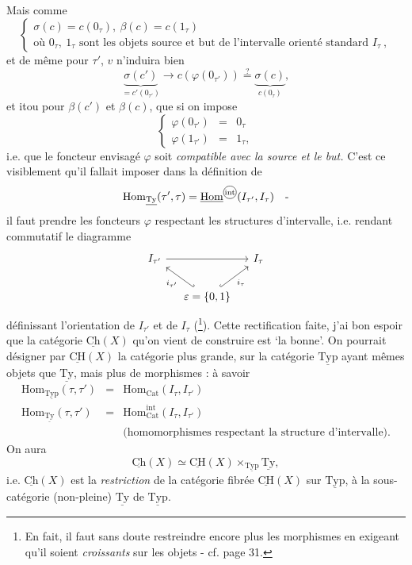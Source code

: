 \documentclass[11pt]{article}
\newcommand{\printedpage}[1]{\marginpar{\footnotesize p.~#1}}
\newcommand{\msp}[1]{\marginpar{\footnotesize [#1]}}
\newcommand{\ul}[1]{\underline{\mathrm{#1}}}
\newcommand{\circled}[1]{\tikz[baseline=(c.base)]\node[draw,circle,inner sep=0.4pt](c){\scriptsize #1};}
\begin{document}
\printedpage{19}

\msp{page 29}
Mais comme
\[
\left\{
\begin{array}{l}
\sigma(c)=c(0_\tau),\ \beta(c)=c(1_\tau)\\[1ex]
\text{où } 0_\tau,\ 1_\tau \text{ sont les objets source et but de l'intervalle orienté standard } I_\tau\ ,
\end{array}
\right.
\]
et de même pour $\tau'$, $v$ n'induira bien
\[
\underbrace{\sigma(c')}_{=c'(0_{\tau'})} \longrightarrow c(\varphi(0_{\tau'})) \overset{?}{=} \underbrace{\sigma(c)}_{c(0_\tau)},
\]
et itou pour $\beta(c')$ et $\beta(c)$, que si on impose
\[
\boxed{
\left\{
\begin{array}{lcl}
\varphi(0_{\tau'}) & = & 0_\tau\\
\varphi(1_{\tau'}) & = & 1_\tau,
\end{array}
\right.
}
\]
i.e. que le foncteur envisagé $\varphi$ soit \textit{compatible avec la source et le but.} C'est ce visiblement qu'il fallait imposer dans la définition de %
\[
\mathrm{Hom}_{\ul{Ty}}(\tau',\tau)=\underline{\mathrm{Hom}}^{\circled{int}}(I_{\tau'},I_\tau)\quad\text{-}
\]
il faut prendre les foncteurs $\varphi$ respectant les structures d'intervalle, i.e. rendant commutatif le diagramme
\[
\begin{tikzcd}[column sep=small]
I_{\tau'} \arrow[rr] & & I_\tau \\
& \varepsilon=\{0,1\} \arrow[ul, hook', "i_{\tau'}"] \arrow[ur, hook, "i_\tau"'] &
\end{tikzcd}
\]
définissant l'orientation de $I_{\tau'}$ et de $I_\tau$ (\footnote[10]{En fait, il faut sans doute restreindre encore plus les morphismes en exigeant qu'il soient \textit{croissants} sur les objets - cf. page 31.}). Cette rectification faite, j'ai bon espoir que la catégorie $\ul{Ch}(X)$ qu'on vient de construire est `la bonne'. On pourrait désigner par $\ul{CH}(X)$ la catégorie plus grande, sur la catégorie $\ul{Typ}$ ayant mêmes objets que $\ul{Ty}$, mais plus de morphismes : à savoir %
\msp{page 30}
\[
\begin{array}{lcl}
\mathrm{Hom}_{\ul{Typ}}(\tau,\tau') & = & \mathrm{Hom}_{\mathrm{Cat}}(I_\tau,I_{\tau'})\\[0.5ex]
\mathrm{Hom}_{\ul{Ty}}(\tau,\tau') & = & \mathrm{Hom}^{\mathrm{int}}_{\mathrm{Cat}}(I_\tau,I_{\tau'})\\[0.5ex]
 & & \text{(homomorphismes respectant la structure d'intervalle).}
\end{array}
\]
On aura
\[
\ul{Ch}(X)\simeq\ul{CH}(X)\times_{\ul{Typ}}\ul{Ty},
\]
\printedpage{20}
i.e. $\ul{Ch}(X)$ est la \textit{restriction} de la catégorie fibrée $\ul{CH}(X)$ sur $\ul{Typ}$, à la sous-catégorie (non-pleine) $\ul{Ty}$ de $\ul{Typ}$.
\end{document}
